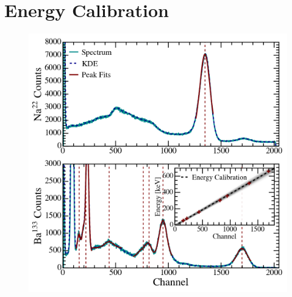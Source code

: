 \documentclass[aps,twocolumn,secnumarabic,balancelastpage,amsmath,amssymb,nofootinbib,floatfix]{revtex4-1}
\begin{document}




\appendix

\section{Energy Calibration}
\label{app:energy_calibration}

\begin{figure}
    \centering
    \includegraphics[width=0.49 \textwidth]{Figures/energy_calibration.png}
    \caption{}
    \label{fig:energy_calibration}
\end{figure}
\end{document}
